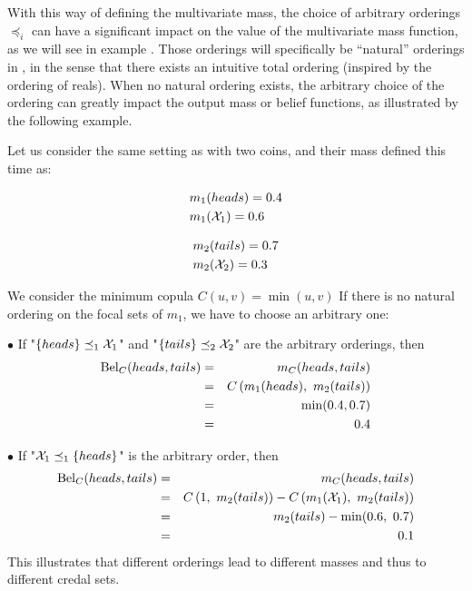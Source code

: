 With this way of defining the multivariate mass, the choice of arbitrary orderings $\preceq_i$ can have a significant impact on the value of the multivariate mass function, as we will see in example . Those orderings will specifically be ``natural'' orderings in , in the sense that there exists an intuitive total ordering (inspired by the ordering of reals). When no natural ordering exists, the arbitrary choice of the ordering can greatly impact the output mass or belief functions, as illustrated by the following example.
\begin{example}\label{ex:joint_mass}
    Let us consider the same setting as  with two coins, and their mass defined this time as:\newline\medskip
    \begin{minipage}{0.5\linewidth}
    	\begin{align*}
    		&m_1(heads)=0.4 \\
    		&m_1(\mathcal{X}_1)=0.6
    	\end{align*}
    \end{minipage}
    \begin{minipage}{0.5\linewidth}
    	\begin{align*}
    		&m_2(tails)=0.7\\
    		&m_2(\mathcal{X}_2)=0.3
    	\end{align*}
    \end{minipage}\bigskip\newline
   We consider the minimum copula $C(u,v)=\min(u,v)$ 
    If there is no natural ordering on the focal sets of $m_1$, we have to choose an arbitrary one:\par
    $\bullet$ If "$\{heads\}\preceq_1 \mathcal{X}_1$" and "$\{tails\}\preceq_2\mathcal{X}_2$" are the arbitrary orderings, then
    \begin{eqnarray*}
        \mathrm{Bel}_C(heads,tails) &=& m_C(heads,tails)\\
        &=&C\left(m_1(heads),~m_2(tails)\right)\\
        &=& \min(0.4,0.7)\\
        &=&0.4
    \end{eqnarray*}\par
    $\bullet$ If "$\mathcal{X}_1\preceq_1 \{heads\}$" is the arbitrary order, then
    \begin{eqnarray*}
        \mathrm{Bel}_C(heads,tails) &=& m_C(heads,tails)\\
        &=&C\left(1,~m_2(tails)\right) - C\left(m_1(\mathcal{X}_1),~m_2(tails)\right)\\
        &=& m_2(tails) -\min(0.6,~0.7)\\
        &=& 0.1
    \end{eqnarray*}
    This illustrates that different orderings lead to different masses and thus to different credal sets.
\end{example}

